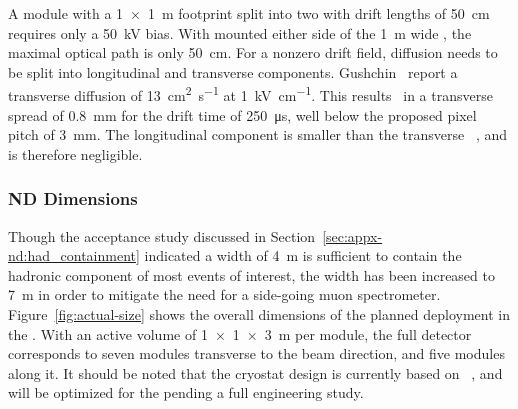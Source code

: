 A module with a \SI{1x1}{\metre} footprint split into two  with drift lengths of \SI{50}{\centi\metre} requires only a \SI{50}{\kilo\volt} bias.
With  mounted either side of the \SI{1}{\metre} wide , the maximal optical path is only \SI{50}{\centi\metre}.
For a nonzero drift field, diffusion needs to be split into longitudinal and transverse components. Gushchin~\cite{gushchin} report a transverse diffusion of \SI{13}{\centi\metre\squared\per\second} at \SI{1}{\kilo\volt\per\centi\metre}.
This results~\cite{Chepel:2012sj} in a transverse spread of \SI{0.8}{\milli\metre} for the drift time of \SI{250}{\micro\second}, well below the proposed pixel pitch of \SI{3}{\milli\metre}.
The longitudinal component is smaller than the transverse ~\cite{Chepel:2012sj},  and is therefore negligible.

\subsubsection{ND Dimensions}
\label{sec:appx-nd:det_dimensions}

Though the acceptance study discussed in Section~\ref{sec:appx-nd:had_containment} indicated a width of \SI{4}{\metre} is sufficient to contain the hadronic component of most events of interest, the width has been increased to 
\SI{7}{\metre} in order to mitigate the need for a side-going muon spectrometer.
Figure~\ref{fig:actual-size} shows the overall dimensions of the planned  deployment in the   . 
With an active volume of \SI{1x1x3}{\metre} per module, the full  detector corresponds to seven modules transverse to the beam direction, and five modules along it. 
It should be noted that the cryostat design is currently based on ~\cite{Abi:2017aow}, and will be optimized for the   pending a full engineering study.  


